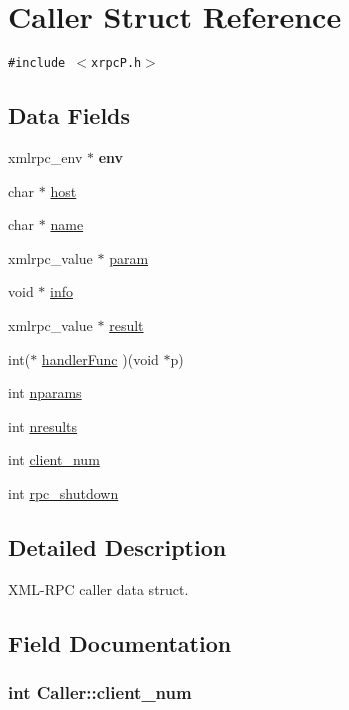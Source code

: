 \hypertarget{structCaller}{
\section{Caller Struct Reference}
\label{structCaller}
}
{\tt \#include $<$xrpcP.h$>$}

\subsection*{Data Fields}
\begin{CompactItemize}
\item 
\hypertarget{structCaller_dee1c4d72e439caeec6fdea9b20c711b}{
xmlrpc\_\-env $\ast$ \textbf{env}}
\label{structCaller_dee1c4d72e439caeec6fdea9b20c711b}

\item 
char $\ast$ \hyperlink{structCaller_67413ee10f064354a789c92374d1f823}{host}
\item 
char $\ast$ \hyperlink{structCaller_6b7a50fb0cf0da41c01662088de4d79e}{name}
\item 
xmlrpc\_\-value $\ast$ \hyperlink{structCaller_29d5894771b1992590480d27ceb401e5}{param}
\item 
void $\ast$ \hyperlink{structCaller_a99bc0344a1f25e580ead02f48675c58}{info}
\item 
xmlrpc\_\-value $\ast$ \hyperlink{structCaller_96d6cfd2ecc822be1f59b80216def471}{result}
\item 
int($\ast$ \hyperlink{structCaller_05f32e75bb7528cc2f545e106efa8803}{handlerFunc} )(void $\ast$p)
\item 
int \hyperlink{structCaller_1dbd14c65b8f3e0046ec1dc73f6f69f9}{nparams}
\item 
int \hyperlink{structCaller_d8f29c03ab60a299089385d5e82aa8c6}{nresults}
\item 
int \hyperlink{structCaller_14f07b2f5e12f87b72dbeb56998155c6}{client\_\-num}
\item 
int \hyperlink{structCaller_0ca9f4efebeb5d3859a2dfee2a62a79f}{rpc\_\-shutdown}
\end{CompactItemize}


\subsection{Detailed Description}
XML-RPC caller data struct. 

\subsection{Field Documentation}
\hypertarget{structCaller_14f07b2f5e12f87b72dbeb56998155c6}{
\subsubsection[{client\_\-num}]{\setlength{\rightskip}{0pt plus 5cm}int {\bf Caller::client\_\-num}}}
\label{structCaller_14f07b2f5e12f87b72dbeb56998155c6}


